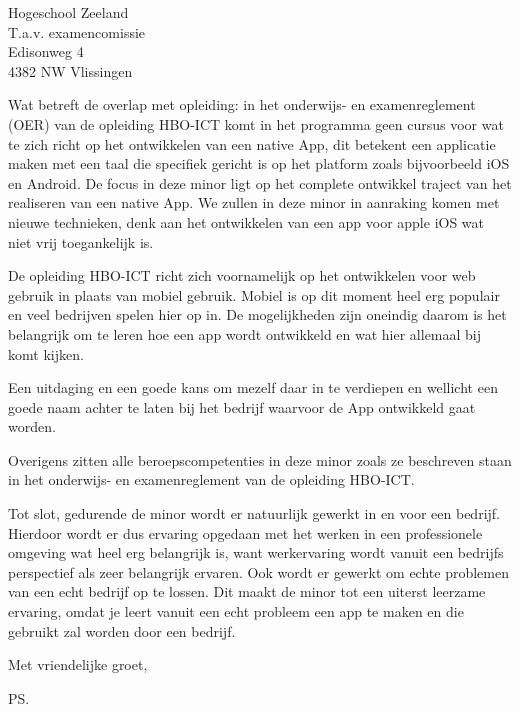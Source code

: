 \documentclass{letter}
\begin{document}
\begin{letter}{Hogeschool Zeeland \\ T.a.v. examencomissie \\ Edisonweg 4 \\ 4382 NW Vlissingen}
\newline

Wat betreft de overlap met opleiding: in het onderwijs- en examenreglement (OER) van de opleiding HBO-ICT komt in het programma geen cursus voor wat te zich richt op het ontwikkelen van een native App, dit betekent een applicatie maken met een taal die specifiek gericht is op het platform zoals bijvoorbeeld iOS en Android. De focus in deze minor ligt op het complete ontwikkel traject van het realiseren van een native App. We zullen in deze minor in aanraking komen met nieuwe technieken, denk aan het ontwikkelen van een app voor apple iOS wat niet vrij toegankelijk is. 

\newline

De opleiding HBO-ICT richt zich voornamelijk op het ontwikkelen voor web gebruik in plaats van mobiel gebruik. Mobiel is op dit moment heel erg populair en veel bedrijven spelen hier op in. 
De mogelijkheden zijn oneindig daarom is het belangrijk om te leren hoe een app wordt ontwikkeld en wat hier allemaal bij komt kijken.

\newline

Een uitdaging en een goede kans om mezelf daar in te verdiepen en wellicht een goede naam achter te laten bij het bedrijf waarvoor de App ontwikkeld gaat worden. 

\newline

Overigens zitten alle beroepscompetenties in deze minor zoals ze beschreven staan in het onderwijs- en examenreglement van de opleiding HBO-ICT.

\newline

Tot slot, gedurende de minor wordt er natuurlijk gewerkt in en voor een bedrijf. Hierdoor wordt er dus ervaring opgedaan met het werken in een professionele omgeving wat heel erg belangrijk is, want werkervaring wordt vanuit een bedrijfs perspectief als zeer belangrijk ervaren. Ook wordt er gewerkt om echte problemen van een echt bedrijf op te lossen. Dit maakt de minor tot een uiterst leerzame ervaring, omdat je leert vanuit een echt probleem een app te maken en die gebruikt zal worden door een bedrijf.


\closing{Met vriendelijke groet, }
\ps

\end{letter}
\end{document}
